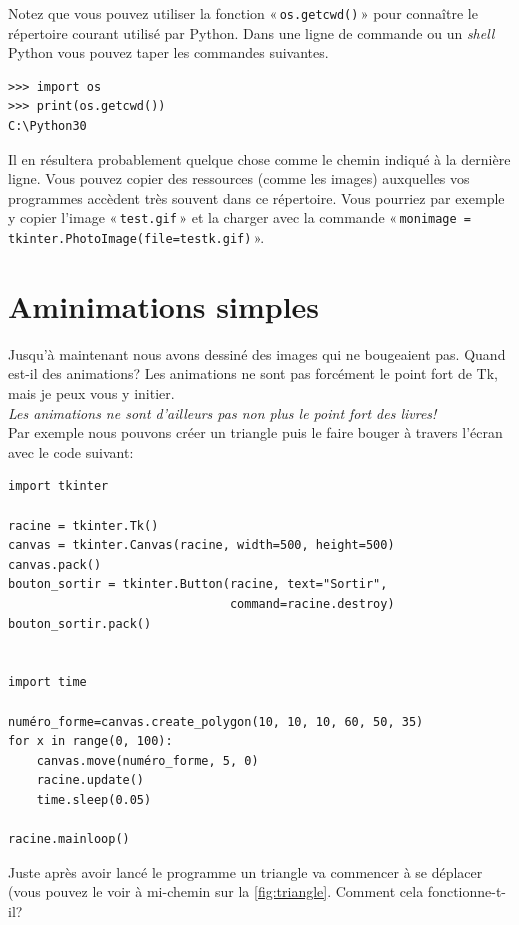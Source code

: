 Notez que vous pouvez utiliser la fonction « \texttt{os.getcwd()} » pour connaître le répertoire courant utilisé par Python. Dans une ligne de commande ou un \emph{shell} Python vous pouvez taper les commandes suivantes.
\begin{Verbatim}[frame=single,rulecolor=\color{mbleu}, label=à taper]
>>> import os 
>>> print(os.getcwd())
C:\Python30
\end{Verbatim}

Il en résultera probablement quelque chose comme le chemin indiqué à la dernière ligne. Vous pouvez copier des ressources (comme les images) auxquelles vos programmes accèdent très souvent dans ce répertoire. Vous pourriez par exemple y copier l'image « \texttt{test.gif} » et la charger avec la commande « \texttt{monimage = tkinter.PhotoImage(file=testk.gif)} ».

\section{Aminimations simples}
Jusqu'à maintenant nous avons dessiné des images qui ne bougeaient pas. Quand est-il des animations?
Les animations ne sont pas forcément le point fort de Tk, mais je peux vous y initier.\\

\emph{Les animations ne sont d'ailleurs pas non plus le point fort des livres!}\\

Par exemple nous pouvons créer un triangle puis le faire bouger à travers l'écran avec le code suivant:
\begin{Verbatim}[frame=single,rulecolor=\color{mbleu}, label=à taper]
import tkinter

racine = tkinter.Tk()
canvas = tkinter.Canvas(racine, width=500, height=500)
canvas.pack()
bouton_sortir = tkinter.Button(racine, text="Sortir",
                               command=racine.destroy)
bouton_sortir.pack()


import time

numéro_forme=canvas.create_polygon(10, 10, 10, 60, 50, 35)
for x in range(0, 100):
    canvas.move(numéro_forme, 5, 0)
    racine.update()
    time.sleep(0.05)

racine.mainloop()
\end{Verbatim}

Juste après avoir lancé le programme un triangle va commencer à se déplacer (vous pouvez le voir à mi-chemin sur la \autoref{fig:triangle}. Comment cela fonctionne-t-il?

